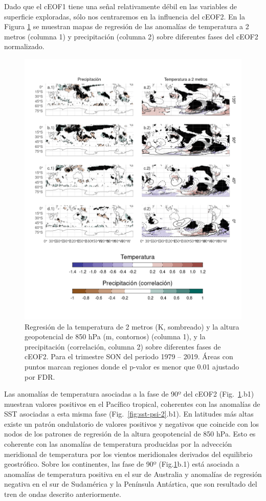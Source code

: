 \documentclass[12pt,oneside]{reedthesis}
\begin{document}
Dado que el cEOF1 tiene una señal relativamente débil en las variables de superficie exploradas, sólo nos centraremos en la influencia del cEOF2.
En la Figura \ref{fig:pp-temp-2} se muestran mapas de regresión de las anomalías de temperatura a 2 metros (columna 1) y precipitación (columna 2) sobre diferentes fases del cEOF2 normalizado.





\begin{figure}
\includegraphics{figures/20-ceofs/pp-temp-2-1} \caption{Regresión de la temperatura de 2 metros (K, sombreado) y la altura geopotencial de 850 hPa (m, contornos) (columna 1), y la precipitación (correlación, columna 2) sobre diferentes fases de cEOF2.
Para el trimestre SON del periodo 1979 -- 2019.
Áreas con puntos marcan regiones donde el p-valor es menor que 0.01 ajustado por FDR.}\label{fig:pp-temp-2}
\end{figure}

Las anomalías de temperatura asociadas a la fase de 90º del cEOF2 (Fig.~\ref{fig:pp-temp-2}.b1) muestran valores positivos en el Pacífico tropical, coherentes con las anomalías de SST asociadas a esta misma fase (Fig.~\ref{fig:sst-psi-2}.b1).
En latitudes más altas existe un patrón ondulatorio de valores positivos y negativos que coincide con los nodos de los patrones de regresión de la altura geopotencial de 850 hPa.
Esto es coherente con las anomalías de temperatura producidas por la advección meridional de temperatura por los vientos meridionales derivados del equilibrio geostrófico.
Sobre los continentes, las fase de 90º (Fig.\ref{fig:pp-temp-2}b.1) está asociada a anomalías de temperatura positiva en el sur de Australia y anomalías de regresión negativa en el sur de Sudamérica y la Península Antártica, que son resultado del tren de ondas descrito anteriormente.
\end{document}

